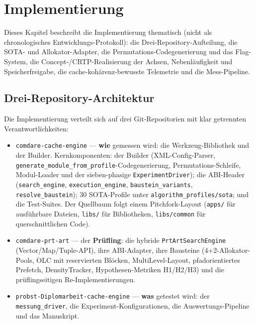\chapter{Implementierung}\label{ch:impl}

Dieses Kapitel beschreibt die Implementierung thematisch (nicht als chronologisches
Entwicklungs-Protokoll): die Drei-Repository-Aufteilung, die SOTA- und Allokator-Adapter, die
Permutations-Codegenerierung und das Flag-System, die Concept-/CRTP-Realisierung der Achsen,
Nebenläufigkeit und Speicherfreigabe, die cache-kohärenz-bewusste Telemetrie und die
Mess-Pipeline.

\section{Drei-Repository-Architektur}\label{sec:repos}

Die Implementierung verteilt sich auf drei Git-Repositorien mit klar getrennten
Verantwortlichkeiten:

\begin{itemize}
  \item \texttt{comdare-cache-engine} --- \textbf{wie} gemessen wird: die Werkzeug-Bibliothek
        und der Builder. Kernkomponenten: der Builder (XML-Config-Parser,
        \texttt{generate\_module\_from\_profile}-Codegenerierung, Permutations-Schleife,
        Modul-Loader und der sieben-phasige \texttt{ExperimentDriver}); die ABI-Header
        (\texttt{search\_engine}, \texttt{execution\_engine}, \texttt{baustein\_variants},
        \texttt{resolve\_baustein}); 30 SOTA-Profile unter \texttt{algorithm\_profiles/sota};
        und die Test-Suites. Der Quellbaum folgt einem Pitchfork-Layout (\texttt{apps/} für
        ausführbare Dateien, \texttt{libs/} für Bibliotheken, \texttt{libs/common} für
        querschnittlichen Code).
  \item \texttt{comdare-prt-art} --- der \textbf{Prüfling}: die hybride
        \texttt{PrtArtSearchEngine} (Vector/Map/Tuple-API), ihre ABI-Adapter, ihre Bausteine
        (4+2-Allokator-Pools, OLC mit reservierten Blöcken, MultiLevel-Layout, pfadorientiertes
        Prefetch, DensityTracker, Hypothesen-Metriken H1/H2/H3) und die
        prüflingseitigen Re-Implementierungen.
  \item \texttt{probst-Diplomarbeit-cache-engine} --- \textbf{was} getestet wird: der
        \texttt{messung\_driver}, die Experiment-Konfigurationen, die Auswertungs-Pipeline und
        das Manuskript.
\end{itemize}

